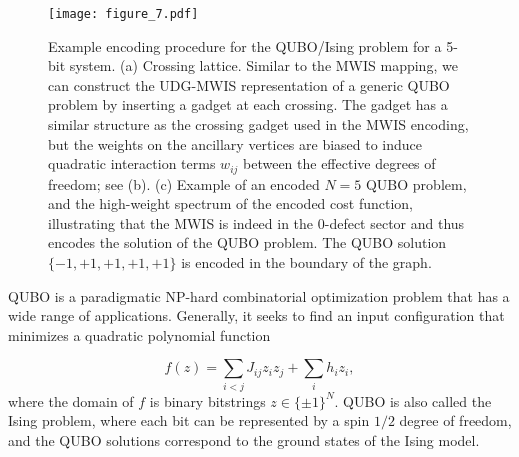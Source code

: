 \begin{figure}[t!]
\hspace{-0.8cm}
    \centering
    \texttt{[image: figure\_7.pdf]}
     \caption{Example encoding procedure for the QUBO/Ising problem for a 5-bit system. (a) Crossing lattice.  Similar to the MWIS mapping, we can construct the UDG-MWIS representation of a generic QUBO problem by inserting a gadget at each crossing. The gadget has a similar structure as the crossing gadget used in the MWIS encoding, but the weights on the ancillary vertices are biased to induce quadratic interaction terms $w_{ij}$  between the effective degrees of freedom; see (b). (c) Example of an encoded $N=5$ QUBO problem, and the high-weight spectrum of the encoded cost function, illustrating that the MWIS is indeed in the 0-defect sector and thus encodes the solution of the QUBO problem. The QUBO solution $\{-1, +1, +1, +1, +1\}$ is encoded in the boundary of the graph. }
    \label{fig:weighted_crossing_gadget}
\end{figure}

QUBO is a paradigmatic NP-hard combinatorial optimization problem that has a wide range of applications. Generally, it seeks to find an input configuration that minimizes a quadratic polynomial function

\begin{equation}
    f(z) = \sum_{i<j}J_{ij}z_i z_j + \sum_i h_i z_i,
\end{equation}
where the domain of $f$ is binary bitstrings $z\in \{\pm 1\}^N$. QUBO is also called the Ising problem, where each bit can be represented by a spin $1/2$ degree of freedom, and the QUBO solutions correspond to the ground states of the Ising model.


